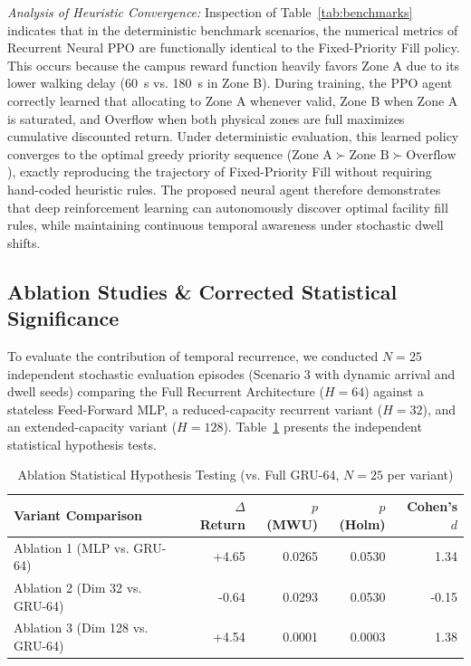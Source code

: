 \documentclass[journal]{IEEEtran}
\begin{document}
\textit{Analysis of Heuristic Convergence:} Inspection of Table~\ref{tab:benchmarks} indicates that in the deterministic benchmark scenarios, the numerical metrics of Recurrent Neural PPO are functionally identical to the Fixed-Priority Fill policy. This occurs because the campus reward function heavily favors Zone A due to its lower walking delay (60~s vs. 180~s in Zone B). During training, the PPO agent correctly learned that allocating to Zone A whenever valid, Zone B when Zone A is saturated, and Overflow when both physical zones are full maximizes cumulative discounted return. Under deterministic evaluation, this learned policy converges to the optimal greedy priority sequence ($\text{Zone A} \succ \text{Zone B} \succ \text{Overflow}$), exactly reproducing the trajectory of Fixed-Priority Fill without requiring hand-coded heuristic rules. The proposed neural agent therefore demonstrates that deep reinforcement learning can autonomously discover optimal facility fill rules, while maintaining continuous temporal awareness under stochastic dwell shifts.

\subsection{Ablation Studies \& Corrected Statistical Significance}
To evaluate the contribution of temporal recurrence, we conducted $N=25$ independent stochastic evaluation episodes (Scenario 3 with dynamic arrival and dwell seeds) comparing the Full Recurrent Architecture ($H=64$) against a stateless Feed-Forward MLP, a reduced-capacity recurrent variant ($H=32$), and an extended-capacity variant ($H=128$). Table~\ref{tab:ablations} presents the independent statistical hypothesis tests.

\begin{table}[h]
\caption{Ablation Statistical Hypothesis Testing (vs. Full GRU-64, $N=25$ per variant)}
\label{tab:ablations}
\centering
\begin{tabular}{lrrrr}
\toprule
\textbf{Variant Comparison} & \textbf{$\Delta$ Return} & \textbf{$p$ (MWU)} & \textbf{$p$ (Holm)} & \textbf{Cohen's $d$} \\
\midrule
Ablation 1 (MLP vs. GRU-64) & +4.65 & 0.0265 & 0.0530 & 1.34 \\
Ablation 2 (Dim 32 vs. GRU-64) & -0.64 & 0.0293 & 0.0530 & -0.15 \\
Ablation 3 (Dim 128 vs. GRU-64) & +4.54 & 0.0001 & 0.0003 & 1.38 \\
\bottomrule
\end{tabular}
\end{table}
\end{document}
